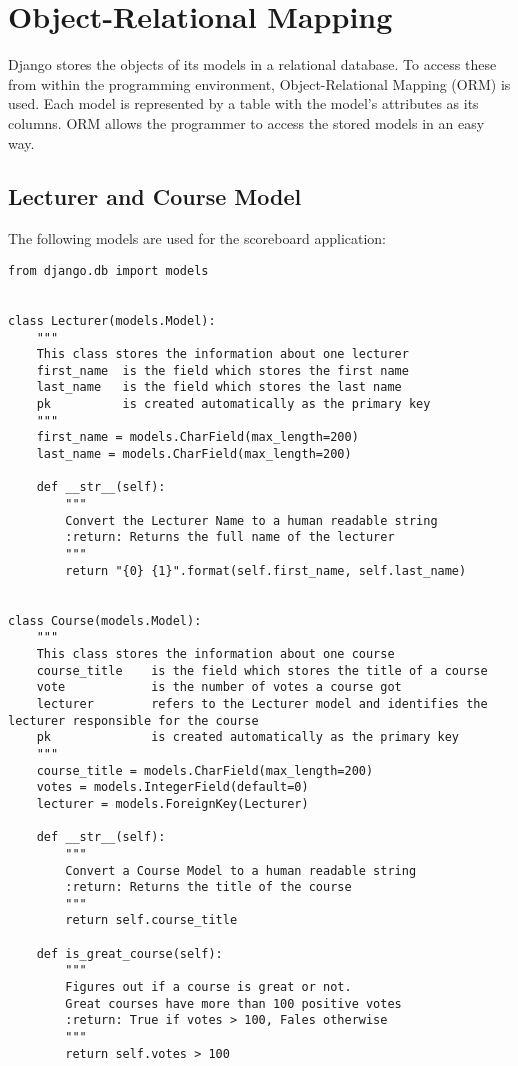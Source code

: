 \section{Object-Relational Mapping}

Django stores the objects of its models in a relational database. To access these from within the programming environment, Object-Relational Mapping (ORM) is used. Each model is represented by a table with the model's attributes as its columns. ORM allows the programmer to access the stored models in an easy way.

\subsection{Lecturer and Course Model}
The following models are used for the scoreboard application:

\begin{lstlisting}[style=Python, caption=scorecard/models.py, label=lst:models.py]
from django.db import models


class Lecturer(models.Model):
    """
    This class stores the information about one lecturer
    first_name  is the field which stores the first name
    last_name   is the field which stores the last name
    pk          is created automatically as the primary key
    """
    first_name = models.CharField(max_length=200)
    last_name = models.CharField(max_length=200)

    def __str__(self):
        """
        Convert the Lecturer Name to a human readable string
        :return: Returns the full name of the lecturer
        """
        return "{0} {1}".format(self.first_name, self.last_name)


class Course(models.Model):
    """
    This class stores the information about one course
    course_title    is the field which stores the title of a course
    vote            is the number of votes a course got
    lecturer        refers to the Lecturer model and identifies the lecturer responsible for the course
    pk              is created automatically as the primary key
    """
    course_title = models.CharField(max_length=200)
    votes = models.IntegerField(default=0)
    lecturer = models.ForeignKey(Lecturer)

    def __str__(self):
        """
        Convert a Course Model to a human readable string
        :return: Returns the title of the course
        """
        return self.course_title

    def is_great_course(self):
        """
        Figures out if a course is great or not.
        Great courses have more than 100 positive votes
        :return: True if votes > 100, Fales otherwise
        """
        return self.votes > 100
\end{lstlisting}

